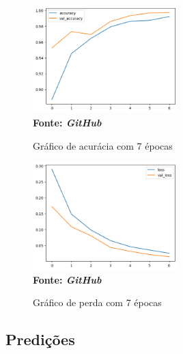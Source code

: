 \begin{figure}[ht]
 	\centering	
 	\caption[\hspace{0.1cm}Grade Computacional.]{Gráfico de acurácia com 7 épocas}
 	\vspace{-0.4cm}
 	\includegraphics[width=0.5\textwidth]{figuras/accuracy_7.png}
 	\captionsetup{justification=centering}
	\vspace{-0.2cm}
     \\\textbf{\footnotesize Fonte: \textit{GitHub}}
	\label{fig:acc7}
\end{figure}

\begin{figure}[ht]
 	\centering	
 	\caption[\hspace{0.1cm}Grade Computacional.]{Gráfico de perda com 7 épocas}
 	\vspace{-0.4cm}
 	\includegraphics[width=0.5\textwidth]{figuras/loss_7.png}
 	\captionsetup{justification=centering}
	\vspace{-0.2cm}
     \\\textbf{\footnotesize Fonte: \textit{GitHub}}
	\label{fig:loss7}
\end{figure}

\subsection{\esp Predições} \label{pred}

